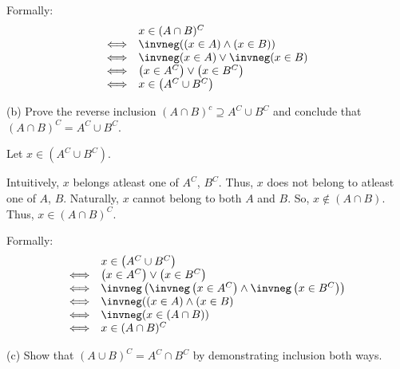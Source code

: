 \documentclass[10pt]{article}
\begin{document}
Formally:
\begin{equation*}
\begin{array}{ r l }
 & x\in ( A\cap B)^{C}\\
\Longleftrightarrow  & \invneg (( x\in A) \land ( x\in B))\\
\Longleftrightarrow  & \invneg ( x\in A) \lor \invneg ( x\in B)\\
\Longleftrightarrow  & \left( x\in A^{C}\right) \lor \left( x\in B^{C}\right)\\
\Longleftrightarrow  & x\in \left( A^{C} \cup B^{C}\right)
\end{array}
\end{equation*}


(b) Prove the reverse inclusion $\displaystyle ( A\cap B)^{c} \supseteq A^{C} \cup B^{C}$ and conclude that $\displaystyle ( A\cap B)^{C} =A^{C} \cup B^{C}$.



Let $\displaystyle x\in \left( A^{C} \cup B^{C}\right)$.



Intuitively, $\displaystyle x$ belongs atleast one of $\displaystyle A^{C}$, $\displaystyle B^{C}$. Thus, $\displaystyle x$ does not belong to atleast one of $\displaystyle A$, $\displaystyle B$. Naturally, $\displaystyle x$ cannot belong to both $\displaystyle A$ and $\displaystyle B$. So, $\displaystyle x\notin ( A\cap B)$. Thus, $\displaystyle x\in ( A\cap B)^{C}$.



Formally: 
\begin{equation*}
\begin{array}{ r l }
 & x\in \left( A^{C} \cup B^{C}\right)\\
\Longleftrightarrow  & \left( x\in A^{C}\right) \lor \left( x\in B^{C}\right)\\
\Longleftrightarrow  & \invneg \left( \invneg \left( x\in A^{C}\right) \land \invneg \left( x\in B^{C}\right)\right)\\
\Longleftrightarrow  & \invneg (( x\in A) \land ( x\in B)\\
\Longleftrightarrow  & \invneg ( x\in ( A\cap B))\\
\Longleftrightarrow  & x\in ( A\cap B)^{C}
\end{array}
\end{equation*}




(c) Show that $\displaystyle ( A\cup B)^{C} =A^{C} \cap B^{C}$ by demonstrating inclusion both ways.
\end{document}
